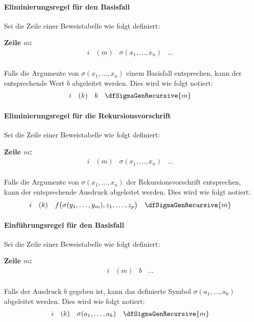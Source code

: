 \documentclass{book}
\theoremstyle{plain}
\theoremstyle{remark}
\theoremstyle{definition}
\begin{document}
\paragraph{Eliminierungsregel für den Basisfall}
Sei die Zeile einer Beweistabelle wie folgt definiert:

\textbf{Zeile \(m\):}
\[
\begin{array}{llll}
   i & (m) & \sigma(x_1, \ldots, x_n) & \dots \\
\end{array}
\]

Falls die Argumente von \(\sigma(x_1, \ldots, x_n)\) einem Basisfall entsprechen, kann der entsprechende Wert \(b\) abgeleitet werden. Dies wird wie folgt notiert:
\[
\begin{array}{llll}
   i & (k) & b & \dfSigmaGenRecursive{m} \\
\end{array}
\]

\paragraph{Eliminierungsregel für die Rekursionsvorschrift}
Sei die Zeile einer Beweistabelle wie folgt definiert:

\textbf{Zeile \(m\):}
\[
\begin{array}{llll}
   i & (m) & \sigma(x_1, \ldots, x_n) & \dots \\
\end{array}
\]

Falls die Argumente von \(\sigma(x_1, \ldots, x_n)\) der Rekursionsvorschrift entsprechen, kann der entsprechende Ausdruck abgeleitet werden. Dies wird wie folgt notiert:
\[
\begin{array}{llll}
   i & (k) & f\big(\sigma(y_1, \ldots, y_m), z_1, \ldots, z_p\big) & \dfSigmaGenRecursive{m} \\
\end{array}
\]

\paragraph{Einführungsregel für den Basisfall}
Sei die Zeile einer Beweistabelle wie folgt definiert:

\textbf{Zeile \(m\):}
\[
\begin{array}{llll}
   i & (m) & b & \dots \\
\end{array}
\]

Falls der Ausdruck \(b\) gegeben ist, kann das definierte Symbol \(\sigma(a_1, \ldots, a_k)\) abgeleitet werden. Dies wird wie folgt notiert:
\[
\begin{array}{llll}
   i & (k) & \sigma(a_1, \ldots, a_k) & \dfSigmaGenRecursive{m} \\
\end{array}
\]
\end{document}
